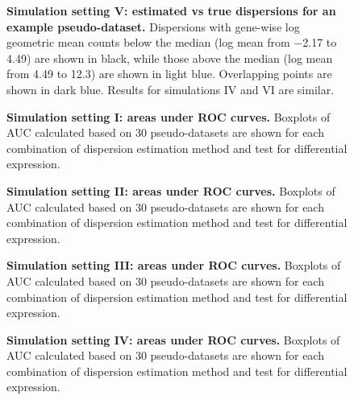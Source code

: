 \documentclass[10pt]{article}
\begin{document}
\begin{figure}[!ht] %
   \centering
 \caption{{\bf  Simulation setting V: estimated vs true dispersions for an example pseudo-dataset.}  Dispersions with gene-wise log geometric mean counts below the median (log mean from $-$2.17 to 4.49) are shown in black, %
 while those above the median (log mean from 4.49 to 12.3) are shown in light blue. %
   Overlapping points are shown in dark blue. %
 Results for simulations IV and VI are similar.}
   \label{fig:pp5}
\end{figure}


\begin{figure}[!ht] %
   \centering
   \caption{{\bf Simulation setting I: areas under ROC curves.} Boxplots of AUC calculated based on 30 pseudo-datasets are shown for each combination of dispersion estimation method and test for differential expression.} %
   \label{fig:auc1}
\end{figure}

\begin{figure}[!ht] %
   \centering
   \caption{{\bf Simulation setting II: areas under ROC curves.} Boxplots of AUC calculated based on 30 pseudo-datasets are shown for each combination of dispersion estimation method and test for differential expression.} %
   \label{fig:auc2}
\end{figure}

\begin{figure}[!ht] %
   \centering
   \caption{{\bf Simulation setting III: areas under ROC curves.} Boxplots of AUC calculated based on 30 pseudo-datasets are shown for each combination of dispersion estimation method and test for differential expression.} %
   \label{fig:auc3}
\end{figure}

\begin{figure}[!ht] %
   \centering
   \caption{{\bf Simulation setting IV: areas under ROC curves.} Boxplots of AUC calculated based on 30 pseudo-datasets are shown for each combination of dispersion estimation method and test for differential expression.} %
   \label{fig:auc4}
\end{figure}
\end{document}
